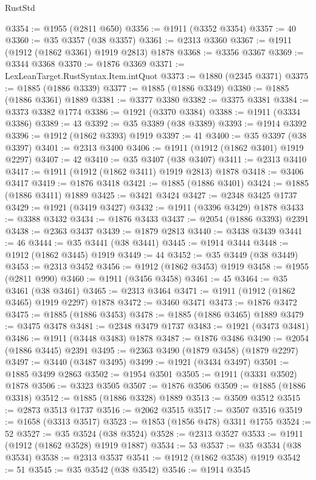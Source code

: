 \begin{lexlean}{RustStd}
\begin{coremodule}
@3354 := @1955 (@2811 @650)
@3356 := @1911 (@3352 @3354)
@3357 := 40
@3360 := @35 @3357 (@38 @3357)
@3361 := @2313 @3360
@3367 := @1911 (@1912 (@1862 @3361) @1919 @2813) @1878
@3368 := @3356 @3367
@3369 := @3344 @3368
@3370 := @1876 @3369
@3371 := LexLeanTarget.RustSyntax.Item.intQuot
@3373 := @1880 (@2345 @3371)
@3375 := @1885 (@1886 @3339)
@3377 := @1885 (@1886 @3349)
@3380 := @1885 (@1886 @3361) @1889
@3381 := @3377 @3380
@3382 := @3375 @3381
@3384 := @3373 @3382 @1774
@3386 := @1921 (@3370 @3384)
@3388 := @1911 (@3334 @3386)
@3389 := 43
@3392 := @35 @3389 (@38 @3389)
@3393 := @1914 @3392
@3396 := @1912 (@1862 @3393) @1919
@3397 := 41
@3400 := @35 @3397 (@38 @3397)
@3401 := @2313 @3400
@3406 := @1911 (@1912 (@1862 @3401) @1919 @2297)
@3407 := 42
@3410 := @35 @3407 (@38 @3407)
@3411 := @2313 @3410
@3417 := @1911 (@1912 (@1862 @3411) @1919 @2813) @1878
@3418 := @3406 @3417
@3419 := @1876 @3418
@3421 := @1885 (@1886 @3401)
@3424 := @1885 (@1886 @3411) @1889
@3425 := @3421 @3424
@3427 := @2348 @3425 @1737
@3429 := @1921 (@3419 @3427)
@3432 := @1911 (@3396 @3429) @1878
@3433 := @3388 @3432
@3434 := @1876 @3433
@3437 := @2054 (@1886 @3393) @2391
@3438 := @2363 @3437
@3439 := @1879 @2813
@3440 := @3438 @3439
@3441 := 46
@3444 := @35 @3441 (@38 @3441)
@3445 := @1914 @3444
@3448 := @1912 (@1862 @3445) @1919
@3449 := 44
@3452 := @35 @3449 (@38 @3449)
@3453 := @2313 @3452
@3456 := @1912 (@1862 @3453) @1919
@3458 := @1955 (@2811 @990)
@3460 := @1911 (@3456 @3458)
@3461 := 45
@3464 := @35 @3461 (@38 @3461)
@3465 := @2313 @3464
@3471 := @1911 (@1912 (@1862 @3465) @1919 @2297) @1878
@3472 := @3460 @3471
@3473 := @1876 @3472
@3475 := @1885 (@1886 @3453)
@3478 := @1885 (@1886 @3465) @1889
@3479 := @3475 @3478
@3481 := @2348 @3479 @1737
@3483 := @1921 (@3473 @3481)
@3486 := @1911 (@3448 @3483) @1878
@3487 := @1876 @3486
@3490 := @2054 (@1886 @3445) @2391
@3495 := @2363 @3490 (@1879 @3458) (@1879 @2297)
@3497 := @3440 (@3487 @3495)
@3499 := @1921 (@3434 @3497)
@3501 := @1885 @3499 @2863
@3502 := @1954 @3501
@3505 := @1911 (@3331 @3502) @1878
@3506 := @3323 @3505
@3507 := @1876 @3506
@3509 := @1885 (@1886 @3318)
@3512 := @1885 (@1886 @3328) @1889
@3513 := @3509 @3512
@3515 := @2873 @3513 @1737
@3516 := @2062 @3515
@3517 := @3507 @3516
@3519 := @1658 (@3313 @3517)
@3523 := @1853 (@1856 @478) @3311 @1755
@3524 := 52
@3527 := @35 @3524 (@38 @3524)
@3528 := @2313 @3527
@3533 := @1911 (@1912 (@1862 @3528) @1919 @1887)
@3534 := 53
@3537 := @35 @3534 (@38 @3534)
@3538 := @2313 @3537
@3541 := @1912 (@1862 @3538) @1919
@3542 := 51
@3545 := @35 @3542 (@38 @3542)
@3546 := @1914 @3545

\end{coremodule}
\end{lexlean}
